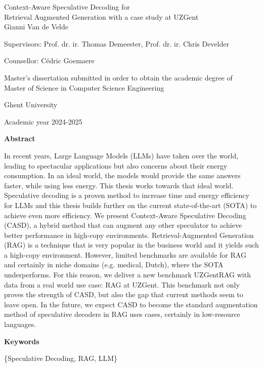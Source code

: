 \newpage
\begin{center}
    \LARGE
    Context-Aware Speculative Decoding for \\Retrieval Augmented
Generation with a case study at UZGent \\
    
    \vspace{1cm}
    \large
    Gianni Van de Velde
    
    Supervisors: Prof. dr. ir. Thomas Demeester, Prof. dr. ir. Chris Develder
    
    Counsellor: Cédric Goemaere
    
    Master's dissertation submitted in order to obtain the academic degree of\\
    Master of Science in Computer Science Engineering
    
    Ghent University
    
    Academic year 2024-2025
\end{center}

\vspace{0.5cm}
\begin{center}
    \textbf{\Large Abstract}
\end{center}

In recent years, Large Language Models (LLMs) have taken over the world, leading to spectacular applications but also concerns about their energy consumption. In an ideal world, the models would provide the same answers faster, while using less energy. This thesis works towards that ideal world. Speculative decoding is a proven method to increase time and energy efficiency for LLMs and this thesis builds further on the current state-of-the-art (SOTA) to achieve even more efficiency. We present Context-Aware Speculative Decoding (CASD), a hybrid method that can augment any other speculator to achieve better performance in high-copy environments. Retrieval-Augmented Generation (RAG) is a technique that is very popular in the business world and it yields such a high-copy environment. However, limited benchmarks are available for RAG and certainly in niche domains (e.g. medical, Dutch), where the SOTA underperforms. For this reason, we deliver a new benchmark UZGentRAG with data from a real world use case: RAG at UZGent. This benchmark not only proves the strength of CASD, but also the gap that current methods seem to leave open. In the future, we expect CASD to become the standard augmentation method of speculative decoders in RAG uses cases, certainly in low-resource languages.

\begin{center}
    \textbf{\Large Keywords}
\end{center}
\begin{center}
    \{Speculative Decoding, RAG, LLM\}
\end{center}
